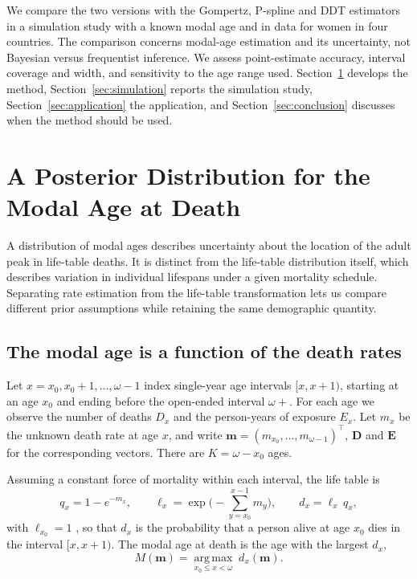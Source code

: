 \documentclass[12pt, letterpaper]{article}
\begin{document}
We compare the two versions with the Gompertz, P-spline and DDT estimators in a simulation study with a known modal age and in data for women in four countries. The comparison concerns modal-age estimation and its uncertainty, not Bayesian versus frequentist inference. We assess point-estimate accuracy, interval coverage and width, and sensitivity to the age range used. Section~\ref{sec:method} develops the method, Section~\ref{sec:simulation} reports the simulation study, Section~\ref{sec:application} the application, and Section~\ref{sec:conclusion} discusses when the method should be used.

\section{A Posterior Distribution for the Modal Age at Death}
\label{sec:method}

A distribution of modal ages describes uncertainty about the location of the adult peak in life-table deaths. It is distinct from the life-table distribution itself, which describes variation in individual lifespans under a given mortality schedule. Separating rate estimation from the life-table transformation lets us compare different prior assumptions while retaining the same demographic quantity.

\subsection{The modal age is a function of the death rates}
\label{sec:target}

Let $x = x_0, x_0+1, \dots, \omega-1$ index single-year age intervals $[x, x+1)$, starting at an age $x_0$ and ending before the open-ended interval $\omega+$. For each age we observe the number of deaths $D_x$ and the person-years of exposure $E_x$. Let $m_x$ be the unknown death rate at age $x$, and write $\bm{m} = (m_{x_0}, \dots, m_{\omega-1})^\top$, $\bm{D}$ and $\bm{E}$ for the corresponding vectors. There are $K = \omega - x_0$ ages.

Assuming a constant force of mortality within each interval, the life table is
\begin{equation}
q_x = 1 - e^{-m_x}, \qquad
\ell_x = \exp\Big(-\sum_{y=x_0}^{x-1} m_y\Big), \qquad
d_x = \ell_x \, q_x ,
\label{eq:lifetable}
\end{equation}
with $\ell_{x_0} = 1$ \citep{preston2000demography}, so that $d_x$ is the probability that a person alive at age $x_0$ dies in the interval $[x, x+1)$. The modal age at death is the age with the largest $d_x$,
\begin{equation}
M(\bm{m}) = \operatorname*{arg\,max}_{x_0 \le x < \omega} \; d_x(\bm{m}).
\label{eq:mode_def}
\end{equation}
\end{document}
